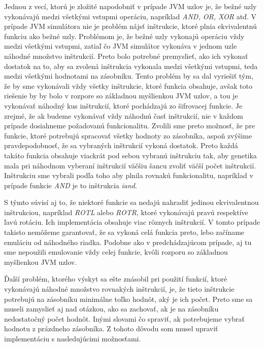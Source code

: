 Jednou z vecí, ktorú je zložité napodobniť v prípade JVM uzlov je, že bežné uzly vykonávajú medzi všetkými vstupmi operáciu, napríklad \textit{AND, OR, XOR} atď. V prípade JVM simulátora nie je problém nájsť inštrukcie, ktoré plnia ekvivalentnú funkciu ako bežné uzly. Problémom je, že bežné uzly vykonajú operáciu vždy medzi všetkými vstupmi, zatiaľ čo JVM simulátor vykonáva v jednom uzle náhodné množstvo inštrukcií. Preto bolo potrebné premyslieť, ako ich vykonať dostatok na to, aby sa zvolená inštrukcia vykonala medzi všetkými vstupmi, teda medzi všetkými hodnotami na zásobníku. Tento problém by sa dal vyriešiť tým, že by sme vykonávali vždy všetky inštrukcie, ktoré funkcia obsahuje, avšak toto riešenie by by bolo v rozpore so základnou myšlienkou JVM uzlov, a tou je vykonávať náhodný kus inštrukcií, ktoré pochádzajú zo šifrovacej funkcie. Je zrejmé, že ak budeme vykonávať vždy náhodnú časť inštrukcií, nie v každom prípade dosiahneme požadovanú funkcionalitu. Zvolili sme preto možnosť, že pre funkcie, ktoré potrebujú spracovať všetky hodnoty zo zásobníka, aspoň zvýšime pravdepodobnosť, že sa vybraných inštrukcií vykoná dostatok. Preto každá takáto funkcia obsahuje viackrát pod sebou vybranú inštrukciu tak, aby genetika mala pri náhodnom vyberaní inštrukcií väčšiu šancu zvoliť väčší počet inštrukcií. Inštrukciu sme vybrali podľa toho aby plnila rovnakú funkcionalitu, napríklad v prípade funkcie \textit{AND} je to inštrukcia \textit{iand}. 

S týmto súvisí aj to, že niektoré funkcie sa nedajú nahradiť jedinou ekvivalentnou inštrukciou, napríklad \textit{ROTL} alebo \textit{ROTR}, ktoré vykonávajú pravú respektíve ľavú rotáciu. Ich implementácia obsahuje viac rôznych inštrukcií. V tomto prípade takisto nemôžeme garantovať, že sa vykoná celá funkcia preto, lebo začíname emuláciu od náhodného riadka. Podobne ako v predchádzajúcom prípade, aj tu sme nepoužili emulovanie vždy celej funkcie, kvôli rozporu so základnou myšlienkou JVM uzlov.

Ďalší problém, ktorého výskyt sa ešte znásobil pri použití funkcií, ktoré vykonávajú náhodné množstvo rovnakých inštrukcií, je, že tieto inštrukcie potrebujú na zásobníku minimálne toľko hodnôt, aký je ich počet. Preto sme sa museli zamyslieť aj nad otázkou, ako sa zachovať, ak je na zásobníku nedostatočný počet hodnôt. Inými slovami čo spraviť, ak potrebujeme vybrať hodnotu z prázdneho zásobníka. Z tohoto dôvodu som musel upraviť implementáciu s nasledujúcimi možnosťami.

